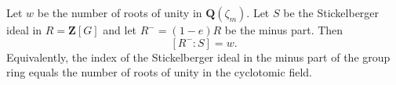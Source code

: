 Let $w$ be the number of roots of unity in $\mathbf{Q}(\zeta_m)$. Let $S$ be the Stickelberger ideal in $R = \mathbf{Z}[G]$ and let $R^- = (1-e)R$ be the minus part. Then
$$[R^- : S] = w.$$
Equivalently, the index of the Stickelberger ideal in the minus part of the group ring equals the number of roots of unity in the cyclotomic field.
